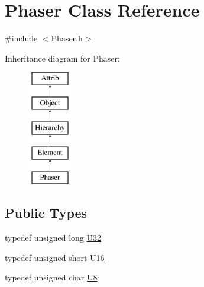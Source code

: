 \hypertarget{classPhaser}{}\section{Phaser Class Reference}
\label{classPhaser}


{\ttfamily \#include $<$Phaser.\+h$>$}

Inheritance diagram for Phaser\+:\begin{figure}[H]
\begin{center}
\leavevmode
\includegraphics[height=5.000000cm]{classPhaser}
\end{center}
\end{figure}
\subsection*{Public Types}
\begin{DoxyCompactItemize}
\item 
typedef unsigned long \hyperlink{classPhaser_a733b5d40a397fc633db055248c76a23f}{U32}
\item 
typedef unsigned short \hyperlink{classPhaser_acadd65d66e8b38a16ad37a23834ee513}{U16}
\item 
typedef unsigned char \hyperlink{classPhaser_a09f745e43da83ab27286e69179755361}{U8}
\end{DoxyCompactItemize}
